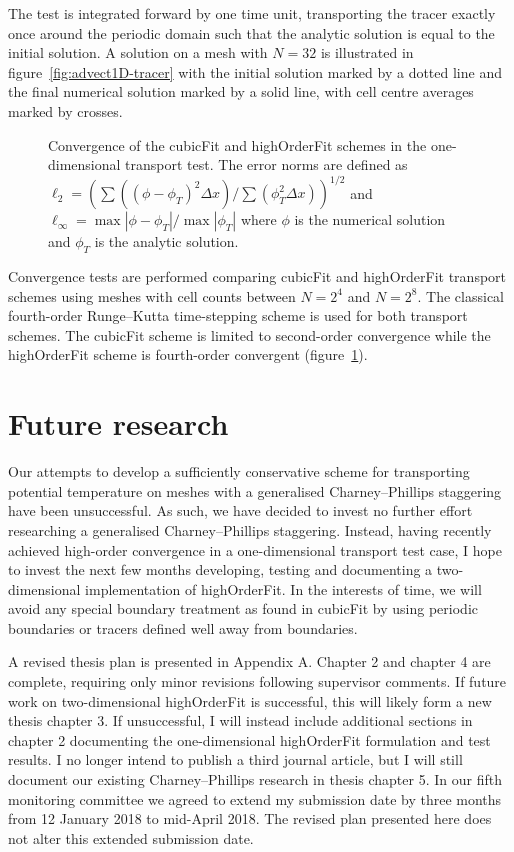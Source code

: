 \documentclass[a4paper,11pt]{article}
\begin{document}
The test is integrated forward by one time unit, transporting the tracer exactly once around the periodic domain such that the analytic solution is equal to the initial solution.  A solution on a mesh with $N = 32$ is illustrated in figure~\ref{fig:advect1D-tracer} with the initial solution marked by a dotted line and the final numerical solution marked by a solid line, with cell centre averages marked by crosses.

\begin{figure}
	\centering
	
	\caption{Convergence of the cubicFit and highOrderFit schemes in the one-dimensional transport test.
	The error norms are defined as $\ell_2 = \left( \sum \left( \left( \phi - \phi_T \right)^2 \Delta x \right) / \sum \left( \phi_T^2 \Delta x \right)\right)^{1/2}$ and $\ell_\infty = \max \left| \phi - \phi_T \right| / \max \left| \phi_T \right|$ where $\phi$ is the numerical solution and $\phi_T$ is the analytic solution.}
	\label{fig:advect1D-convergence}
\end{figure}

Convergence tests are performed comparing cubicFit and highOrderFit transport schemes using meshes with cell counts between $N = 2^4$ and $N = 2^8$.  The classical fourth-order Runge--Kutta time-stepping scheme \citep[p. 53]{durran2013} is used for both transport schemes.  The cubicFit scheme is limited to second-order convergence while the highOrderFit scheme is fourth-order convergent (figure~\ref{fig:advect1D-convergence}).

\section{Future research}

Our attempts to develop a sufficiently conservative scheme for transporting potential temperature on meshes with a generalised Charney--Phillips staggering have been unsuccessful.
As such, we have decided to invest no further effort researching a generalised Charney--Phillips staggering.
Instead, having recently achieved high-order convergence in a one-dimensional transport test case, I hope to invest the next few months developing, testing and documenting a two-dimensional implementation of highOrderFit.
In the interests of time, we will avoid any special boundary treatment as found in cubicFit by using periodic boundaries or tracers defined well away from boundaries.

A revised thesis plan is presented in Appendix A.
Chapter 2 and chapter 4 are complete, requiring only minor revisions following supervisor comments.
If future work on two-dimensional highOrderFit is successful, this will likely form a new thesis chapter 3.
If unsuccessful, I will instead include additional sections in chapter 2 documenting the one-dimensional highOrderFit formulation and test results.
I no longer intend to publish a third journal article, but I will still document our existing Charney--Phillips research in thesis chapter 5.
In our fifth monitoring committee we agreed to extend my submission date by three months from 12 January 2018 to mid-April 2018.
The revised plan presented here does not alter this extended submission date.
\end{document}
